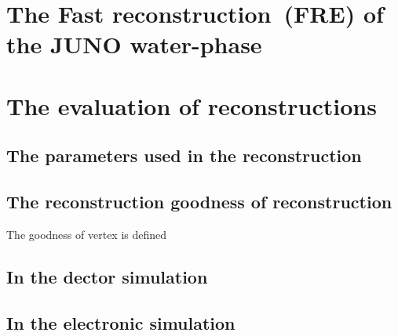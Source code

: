 \section{The Fast reconstruction~(FRE) of the JUNO water-phase}

\section{The evaluation of reconstructions}
\subsection{The parameters used in the reconstruction}
\subsection{The reconstruction goodness of reconstruction}
The goodness of vertex is defined
\subsection{In the dector simulation}
\subsection{In the electronic simulation}
